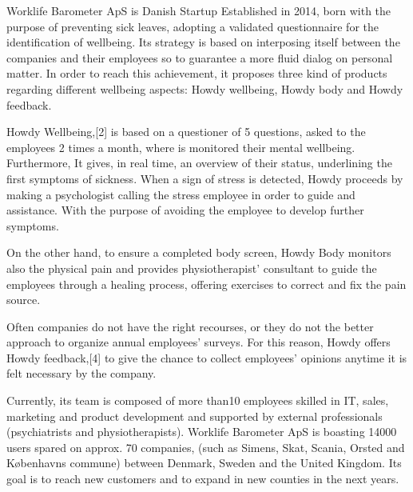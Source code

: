 


Worklife Barometer ApS is  Danish Startup Established in 2014, born with the purpose of preventing sick leaves, adopting a validated questionnaire for the identification of wellbeing. Its strategy is based on interposing itself between the companies and their employees so to guarantee a more fluid dialog on personal matter.     
In order to reach this achievement, it proposes three kind of products regarding different wellbeing aspects: Howdy wellbeing, Howdy body and Howdy feedback.\cite{howdywebsite}

\noindent Howdy Wellbeing,[2] is based on a questioner of 5 questions, asked to the employees 2 times a month, where is monitored their mental wellbeing. 
Furthermore, It gives, in real time, an overview of their status, underlining the first symptoms of sickness.
When a sign of stress is detected, Howdy proceeds by making a psychologist calling the stress employee in order to guide and assistance. With the purpose of avoiding the employee to develop further symptoms.

\noindent On the other hand, to ensure a completed body screen, Howdy Body \cite{howdywebsite} monitors also the physical pain and provides physiotherapist’ consultant to guide the employees through a healing process, offering exercises to correct and fix the pain source.

\noindent Often companies do not have the right recourses, or they do not the better approach to organize annual employees’ surveys. For this reason, Howdy offers Howdy feedback,[4] to give the chance to collect employees’ opinions anytime it is felt necessary by the company.

\noindent Currently, its team is composed of more than10 employees skilled in IT, sales, marketing and product development and supported by external professionals (psychiatrists and physiotherapists). Worklife Barometer ApS is boasting 14000 users spared on approx. 70 companies, (such as Simens, Skat, Scania, Orsted and Københavns commune) between Denmark, Sweden and the United Kingdom. Its goal is to reach new customers and to expand in new counties in the next years.\cite{howdywebsite}

